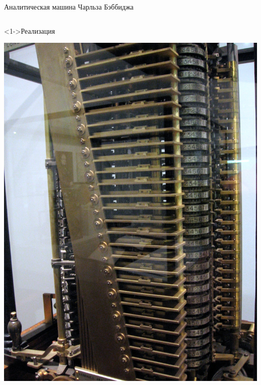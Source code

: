 \documentclass[pdf,9pt,aspectratio=169]{beamer}
\begin{document}
\begin{frame}{Аналитическая машина Чарльза Бэббиджа}
  \begin{columns}[T]
    \begin{column}[]{0.45\textwidth}  
      \begin{exampleblock}<1->{Реализация}
        \begin{center}
          \includegraphics[height=.33\textheight]{images/AnalyticalEngineMill.jpg}\ 

\end{center}
\end{exampleblock}
\end{column}
\end{columns}
\end{frame}
\end{document}
